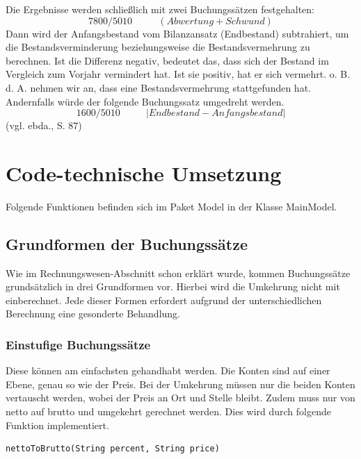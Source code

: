 \documentclass[12pt]{report}
\begin{document}
\noindent Die Ergebnisse werden schließlich mit zwei Buchungssätzen festgehalten:
\[ 7800 / 5010\text{                                      }\text{                                      }\text{                                      }\text{                                      }(Abwertung + Schwund) \]
Dann wird der Anfangsbestand vom Bilanzansatz (Endbestand) subtrahiert, um die Bestandsverminderung beziehungsweise die Bestandsvermehrung zu berechnen. Ist die Differenz negativ, bedeutet das, dass sich der Bestand im Vergleich zum Vorjahr vermindert hat. Ist sie positiv, hat er sich vermehrt. o. B. d. A. nehmen wir an, dass eine Bestandsvermehrung stattgefunden hat. Andernfalls würde der folgende Buchungssatz umgedreht werden.
\[ 1600 / 5010\text{                                      }\text{                                      }\text{                                      }\text{                                      }|Endbestand - Anfangsbestand| \]  (vgl. ebda., S. 87\nocite{RW4})



 
 
\chapter{Code-technische Umsetzung}
  
Folgende Funktionen befinden sich im Paket Model in der Klasse MainModel.
 
\section{Grundformen der Buchungssätze}
Wie im Rechnungswesen-Abschnitt schon erklärt wurde, kommen Buchungssätze grundsätzlich in drei Grundformen vor. Hierbei wird die Umkehrung nicht mit einberechnet. Jede dieser Formen erfordert aufgrund der unterschiedlichen Berechnung eine gesonderte Behandlung.
 
\subsection{Einstufige Buchungssätze}
Diese können am einfachsten gehandhabt werden. Die Konten sind auf einer Ebene, genau so wie der Preis. Bei der Umkehrung müssen nur die beiden Konten vertauscht werden, wobei der Preis an Ort und Stelle bleibt. Zudem muss nur von netto auf brutto und umgekehrt gerechnet werden. Dies wird durch folgende Funktion implementiert.
 
 
\begin{lstlisting}
nettoToBrutto(String percent, String price)
\end{lstlisting}
	
\end{document}
